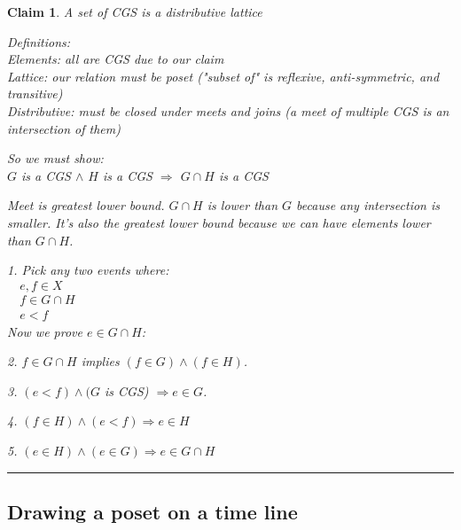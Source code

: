 \documentclass[twoside]{article}
\newtheorem{claim}[theorem]{Claim}
\newenvironment{proof}{{\bf Proof:}}{\hfill\rule{2mm}{2mm}}
\begin{document}
\begin{claim}
A set of CGS is a distributive lattice

\begin{proof}
Definitions:\\
Elements: all are CGS due to our claim\\
Lattice: our relation must be poset ("subset of" is reflexive, anti-symmetric, and transitive)\\
Distributive: must be closed under meets and joins (a meet of multiple CGS is an intersection of them)

So we must show:\\
$G$ is a CGS $\land$ $H$ is a CGS  $\Rightarrow$ $G \cap H$ is a CGS

Meet is greatest lower bound. $G \cap H$ is lower than $G$ because any intersection is smaller. It's also the greatest lower bound because we can have elements lower than $G \cap H$.

1. Pick any two events where:\\
\verb'  '$e,f \in X$\\
\verb'  '$f \in G \cap H$\\
\verb'  '$e < f$\\
Now we prove $e \in G \cap H$:

2. $f \in G \cap H$ implies $(f \in G) \land (f \in H)$.

3. $(e < f) \land (G$ is CGS) $\Rightarrow e \in G$.

4. $(f \in H) \land (e < f) \Rightarrow e \in H$

5. $(e \in H) \land (e \in G) \Rightarrow e \in G \cap H$

\end{proof}

\end{claim}

\subsection{Drawing a poset on a time line}

\end{document}
